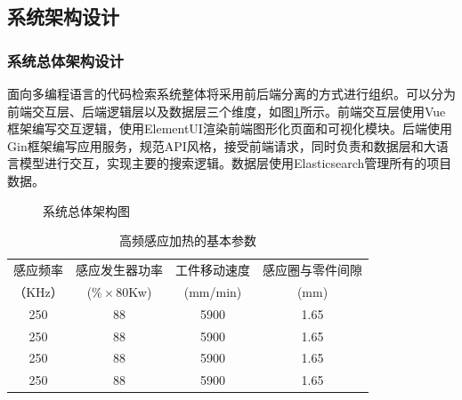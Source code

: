 \documentclass[UTF8,a4paper,12pt]{ctexart}
\numberwithin{equation}{section}
\begin{document}
\subsection{系统架构设计}
\subsubsection{系统总体架构设计}
面向多编程语言的代码检索系统整体将采用前后端分离的方式进行组织。可以分为前端交互层、后端逻辑层以及数据层三个维度，如图\ref{all_structure}所示。前端交互层使用Vue框架编写交互逻辑，使用ElementUI渲染前端图形化页面和可视化模块。后端使用Gin框架编写应用服务，规范API风格，接受前端请求，同时负责和数据层和大语言模型进行交互，实现主要的搜索逻辑。数据层使用Elasticsearch管理所有的项目数据。
\begin{figure}[H]
	\caption{系统总体架构图}
	\label{all_structure}
\end{figure}
\begin{table}[htbp]
\centering
\caption{高频感应加热的基本参数}
\small
\begin{tabular}{c c c c}
\toprule
感应频率 &感应发生器功率 & 工件移动速度  &感应圈与零件间隙\\
（KHz）&($\% \times$80Kw) &(mm/min)  &(mm)\\
\midrule
250 &88 &5900 &1.65\\

250 &88 &5900 &1.65\\

250 &88 &5900 &1.65\\

250 &88 &5900 &1.65\\



\bottomrule
\end{tabular}
\end{table}
\end{document}
